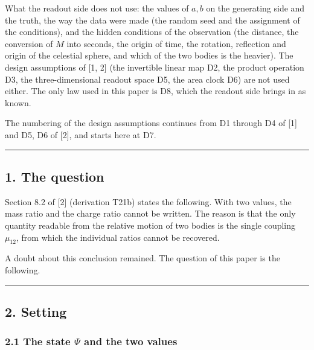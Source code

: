 \documentclass[
  a4paper,
]{article}
\begin{document}
What the readout side does not use: the values of \(a, b\) on the
generating side and the truth, the way the data were made (the random
seed and the assignment of the conditions), and the hidden conditions of
the observation (the distance, the conversion of \(M\) into seconds, the
origin of time, the rotation, reflection and origin of the celestial
sphere, and which of the two bodies is the heavier). The design
assumptions of {[}1, 2{]} (the invertible linear map D2, the product
operation D3, the three-dimensional readout space D5, the area clock D6)
are not used either. The only law used in this paper is D8, which the
readout side brings in as known.

The numbering of the design assumptions continues from D1 through D4 of
{[}1{]} and D5, D6 of {[}2{]}, and starts here at D7.

\begin{center}\rule{0.5\linewidth}{0.5pt}\end{center}

\subsection{1. The question}\label{the-question}

Section 8.2 of {[}2{]} (derivation T21b) states the following. With two
values, the mass ratio and the charge ratio cannot be written. The
reason is that the only quantity readable from the relative motion of
two bodies is the single coupling \(\mu_{12}\), from which the
individual ratios cannot be recovered.

A doubt about this conclusion remained. The question of this paper is
the following.

\begin{center}
\end{center}

\begin{center}\rule{0.5\linewidth}{0.5pt}\end{center}

\subsection{2. Setting}\label{setting}

\subsubsection{\texorpdfstring{2.1 The state \(\Psi\) and the two
values}{2.1 The state \textbackslash Psi and the two values}}\label{the-state-psi-and-the-two-values}
\end{document}
